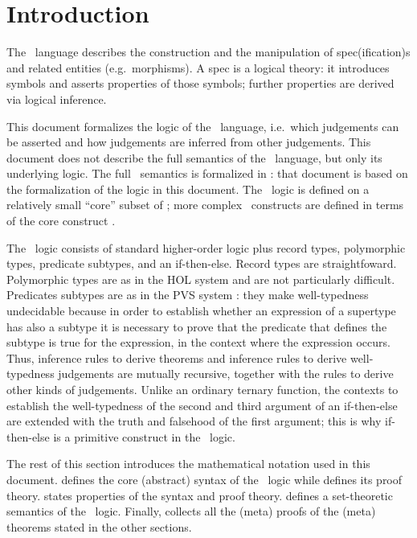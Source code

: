 \section{Introduction}

The \MS\ language \cite{lm} describes the construction and the manipulation of
spec(ification)s and related entities (e.g.\ morphisms). A spec is a logical
theory: it introduces symbols and asserts properties of those symbols; further
properties are derived via logical inference.

This document formalizes the logic of the \MS\ language, i.e.\ which judgements
can be asserted and how judgements are inferred from other judgements. This
document does not describe the full semantics of the \MS\ language, but only its
underlying logic. The full \MS\ semantics is formalized in \cite{semantics}:
that document is based on the formalization of the logic in this document. The
\MS\ logic is defined on a relatively small ``core'' subset of \MS; more complex
\MS\ constructs are defined in terms of the core construct \cite{semantics}.

The \MS\ logic consists of standard higher-order logic \cite{andrews} plus
record types, polymorphic types, predicate subtypes, and an if-then-else. Record
types are straightfoward. Polymorphic types are as in the HOL system \cite{hol}
and are not particularly difficult. Predicates subtypes are as in the PVS system
\cite{pvs-seman}: they make well-typedness undecidable because in order to
establish whether an expression of a supertype has also a subtype it is
necessary to prove that the predicate that defines the subtype is true for the
expression, in the context where the expression occurs. Thus, inference rules to
derive theorems and inference rules to derive well-typedness judgements are
mutually recursive, together with the rules to derive other kinds of judgements.
Unlike an ordinary ternary function, the contexts to establish the
well-typedness of the second and third argument of an if-then-else are extended
with the truth and falsehood of the first argument; this is why if-then-else is
a primitive construct in the \MS\ logic.

The rest of this section introduces the mathematical notation used in this
document.  defines the core (abstract) syntax of the \MS\ logic
while  defines its proof theory.  states
properties of the syntax and proof theory.  defines a
set-theoretic semantics of the \MS\ logic. Finally,  collects all
the (meta) proofs of the (meta) theorems stated in the other sections.

